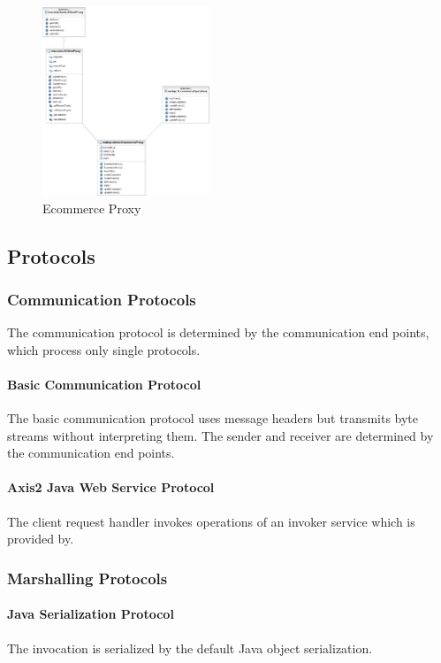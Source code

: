 \begin{figure}[ht!]
	\centering\includegraphics[width=5cm]{uml/EcommerceProxy.jpg} 
	\caption{Ecommerce Proxy}
	\label{fig:clientproxy}
\end{figure}

\subsection{Protocols}

\subsubsection{Communication Protocols}

The communication protocol is determined by the communication end points, which process only single protocols.

\paragraph{Basic Communication Protocol}

The basic communication protocol uses message headers but transmits byte streams without interpreting them.
The sender and receiver are determined by the communication end points.

\paragraph{Axis2 Java Web Service Protocol}

The client request handler invokes operations of an invoker service which is provided by.

\subsubsection{Marshalling Protocols}

\paragraph{Java Serialization Protocol}

The invocation is serialized by the default Java object serialization.
